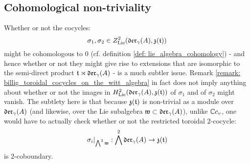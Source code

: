     \subsection{Cohomological non-triviality}
        Whether or not the cocycles:
            $$\sigma_1, \sigma_2 \in Z^2_{\mathrm{Lie}}(\mathfrak{der}_{\gamma}(A), \mathfrak{z}(\mathfrak{t}))$$
        might be cohomologous to $0$ (cf. definition \ref{def: lie_algebra_cohomology}) - and hence whether or not they might give rise to extensions that are isomorphic to the semi-direct product $\mathfrak{t} \rtimes \mathfrak{der}_{\gamma}(A)$ - is a much subtler issue. Remark \ref{remark: billig_toroidal_cocycles_on_the_witt_algebra} in fact does not imply anything about whether or not the images in $H^2_{\mathrm{Lie}}(\mathfrak{der}_{\gamma}(A), \mathfrak{z}(\mathfrak{t}))$ of $\sigma_1$ and of $\sigma_2$ might vanish. The subtlety here is that because $\mathfrak{z}(\mathfrak{t})$ is non-trivial as a module over $\mathfrak{der}_{\gamma}(A)$ (and likewise, over the Lie subalgebra $\mathfrak{w} \subset \mathfrak{der}_{\gamma}(A)$), unlike $\mathbb{C} c_v$, one would have to actually check whether or not the restricted toroidal $2$-cocycle:
            $$\sigma_i|_{\bigwedge^2 \mathfrak{w}}: \bigwedge^2 \mathfrak{der}_{\gamma}(A) \to \mathfrak{z}(\mathfrak{t})$$
        is $2$-coboundary.

